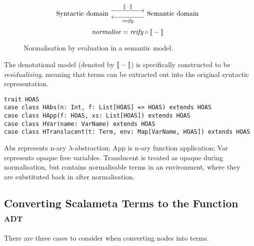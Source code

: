 \documentclass[../../main.tex]{subfiles}
\begin{document}
\begin{figure}
\begin{equation*}
\begin{tikzcd}
  \text{Syntactic domain} \arrow[rr, "\text{\textlbrackdbl} - \text{\textrbrackdbl}", shift left=2] &  & \text{Semantic domain} \arrow[ll, "\textit{reify}", shift left=2]
\end{tikzcd}
\end{equation*}
\vspace{0.5ex}
\begin{equation*}
\textit{normalise} = \textit{reify} \circ \text{\textlbrackdbl} - \text{\textrbrackdbl}
\end{equation*}
\caption{Normalisation by evaluation in a semantic model.}
\label{fig:nbe}
\end{figure}

The denotational model (denoted by $\text{\textlbrackdbl} - \text{\textrbrackdbl}$) is specifically constructed to be \emph{residualising}, meaning that terms can be extracted out into the original syntactic representation.


\begin{verbatim}
trait HOAS
case class HAbs(n: Int, f: List[HOAS] => HOAS) extends HOAS
case class HApp(f: HOAS, xs: List[HOAS]) extends HOAS
case class HVar(name: VarName) extends HOAS
case class HTranslucent(t: Term, env: Map[VarName, HOAS]) extends HOAS
\end{verbatim}
%
Abs represents n-ary $\lambda$-abstraction; App is n-ary function application; Var represents opaque free variables.
Translucent is treated as opaque during normalisation, but contains normalisable terms in an environment, where they are substituted back in after normalisation.


\subsection{Converting Scalameta Terms to the Function \textsc{adt}}
There are three cases to consider when converting  nodes into  terms.
\end{document}
